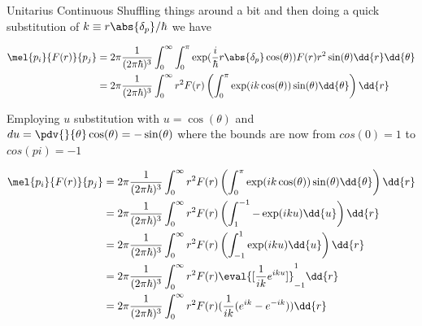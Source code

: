 \begin{answer}
\begin{answerpart}{Unitarius Continuous}
    Shuffling things around a bit and then doing a quick substitution
    of $k \equiv r\abs{\delta_p}/\hbar$ we have
    
    \begin{equation}
      \begin{alignedat}{2}
        &&\mel{p_i}{F(r)}{p_j}
        &= 2\pi \frac{1}{(2\pi\hbar)^3}
        \int_{0}^{\infty} \int_{0}^{\pi}
        \exp(\frac{i}{\hbar}r\abs{\delta_p}\cos(\theta))
        F(r)
        r^2 \sin(\theta) \dd{r}\dd{\theta}
        \\
        &&&= 2\pi \frac{1}{(2\pi\hbar)^3}
        \int_{0}^{\infty}
        r^2 F(r)
        \left(
        \int_{0}^{\pi}
        \exp(ik\cos(\theta))
        \sin(\theta)
        \dd{\theta}
        \right)
        \dd{r}
        \\
      \end{alignedat}
    \end{equation}

    Employing $u$ substitution with $u = \cos(\theta)$ and $du =
    \pdv{}{\theta}\cos(\theta) = -\sin(\theta)$ where the bounds are
    now from $cos(0)=1$ to $cos(pi)=-1$

    \begin{equation}
      \begin{alignedat}{2}
        &&\mel{p_i}{F(r)}{p_j}
        &= 2\pi \frac{1}{(2\pi\hbar)^3}
        \int_{0}^{\infty}
        r^2 F(r)
        \left(
        \int_{0}^{\pi}
        \exp(ik\cos(\theta))
        \sin(\theta)
        \dd{\theta}
        \right)
        \dd{r}
        \\
        &&&= 2\pi \frac{1}{(2\pi\hbar)^3}
        \int_{0}^{\infty}
        r^2 F(r)
        \left(
        \int_{1}^{-1}
        -
        \exp(iku)
        \dd{u}
        \right)
        \dd{r}
        \\
        &&&= 2\pi \frac{1}{(2\pi\hbar)^3}
        \int_{0}^{\infty}
        r^2 F(r)
        \left(
        \int_{-1}^{1}
        \exp(iku)
        \dd{u}
        \right)
        \dd{r}
        \\
        &&&= 2\pi \frac{1}{(2\pi\hbar)^3}
        \int_{0}^{\infty}
        r^2 F(r)
        \eval{[\frac{1}{ik}e^{iku}]}_{-1}^{1}
        \dd{r}
        \\
        &&&= 2\pi \frac{1}{(2\pi\hbar)^3}
        \int_{0}^{\infty}
        r^2 F(r)
        (\frac{1}{ik}(e^{ik} - e^{-ik}))
        \dd{r}
        \\
      \end{alignedat}
    \end{equation}


\end{answerpart}
\end{answer}
